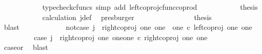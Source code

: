 \begin{isabellebody}
\ \ \ \ \ \ \ \ \ \ \isamarkupfalse%
\ {\isacharparenleft}{\kern0pt}typecheck{\isacharunderscore}{\kern0pt}cfuncs{\isacharcomma}{\kern0pt}\ simp\ add{\isacharcolon}{\kern0pt}\ left{\isacharunderscore}{\kern0pt}coproj{\isacharunderscore}{\kern0pt}cfunc{\isacharunderscore}{\kern0pt}coprod{\isacharparenright}{\kern0pt}\isanewline
\ \ \ \ \ \ \ \ \isamarkupfalse%
\ \isamarkupfalse%
\ {\isacharquery}{\kern0pt}thesis\isanewline
\ \ \ \ \ \ \ \ \ \ \isamarkupfalse%
\ calculation\ j{\isacharunderscore}{\kern0pt}def\ \isamarkupfalse%
\ presburger\isanewline
\ \ \ \ \ \ \isamarkupfalse%
\isanewline
\ \ \ \ \ \ \isamarkupfalse%
\ \isamarkupfalse%
\ {\isacharquery}{\kern0pt}thesis\isanewline
\ \ \ \ \ \ \ \ \isamarkupfalse%
\ blast\isanewline
\ \ \ \ \isamarkupfalse%
\isanewline
\ \ \ \ \ \ \isamarkupfalse%
\ not{\isacharunderscore}{\kern0pt}case{}{\isacharcolon}{\kern0pt}\ {\isachardoublequoteopen}j\ {\isasymnoteq}\ right{\isacharunderscore}{\kern0pt}coproj\ one\ {\isacharparenleft}{\kern0pt}one\ {\isasymCoprod}\ one{\isacharparenright}{\kern0pt}\ {\isasymcirc}\isactrlsub c\ left{\isacharunderscore}{\kern0pt}coproj\ one\ one{\isachardoublequoteclose}\isanewline
\ \ \ \ \ \ \isamarkupfalse%
\ \isamarkupfalse%
\ case{}{\isacharcolon}{\kern0pt}\ {\isachardoublequoteopen}j\ {\isacharequal}{\kern0pt}\ right{\isacharunderscore}{\kern0pt}coproj\ one\ {\isacharparenleft}{\kern0pt}one{\isasymCoprod}one{\isacharparenright}{\kern0pt}\ {\isasymcirc}\isactrlsub c\ right{\isacharunderscore}{\kern0pt}coproj\ one\ one{\isachardoublequoteclose}\isanewline
\ \ \ \ \ \ \ \ \isamarkupfalse%
\ case{}{\isacharunderscore}{\kern0pt}or{\isacharunderscore}{\kern0pt}{}\ \isamarkupfalse%
\ blast\isanewline
\ \ \ \ \ \ \isamarkupfalse%
\ {\isachardoublequoteopen}{\isasymlangle}{\isasymf}{\isacharcomma}{\kern0pt}\ {\isasymt}{\isasymrangle}\ {\isacharequal}{\kern0pt}\ {\isasymlangle}{\isasymt}{\isacharcomma}{\kern0pt}{\isasymt}{\isasymrangle}{\isachardoublequoteclose}\isanewline
\ \ \ \ \ \ \isamarkupfalse%
\ {\isacharminus}{\kern0pt}\ \isanewline
\ \ \ \ \ \ \ \ \isamarkupfalse%

\end{isabellebody}
